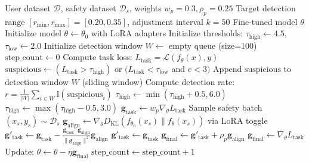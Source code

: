 \begin{algorithm}[H]
\caption{SelGrad Training with Adaptive Thresholds}
\label{alg:selgrad}
\footnotesize
\begin{algorithmic}[1]
\REQUIRE User dataset $\mathcal{D}$, safety dataset $\mathcal{D}_s$, weights $w_p=0.3, \rho_p=0.25$
\REQUIRE Target detection range $[r_{\min}, r_{\max}]=[0.20, 0.35]$, adjustment interval $k=50$
\ENSURE Fine-tuned model $\theta$
\STATE Initialize model $\theta \leftarrow \theta_0$ with LoRA adapters
\STATE Initialize thresholds: $\tau_{\text{high}} \leftarrow 4.5$, $\tau_{\text{low}} \leftarrow 2.0$
\STATE Initialize detection window $W \leftarrow$ empty queue (size=100)
\STATE $\text{step\_count} \leftarrow 0$
        \STATE {}
        \STATE Compute task loss: $L_{\text{task}} = \mathcal{L}(f_\theta(x), y)$
        \STATE $\text{suspicious} \leftarrow (L_{\text{task}} > \tau_{\text{high}})$ or $(L_{\text{task}} < \tau_{\text{low}}$ and $e < 3)$
        \STATE Append $\text{suspicious}$ to detection window $W$ (sliding window)
        \STATE {}
            \STATE Compute detection rate: $r = \frac{1}{|W|}\sum_{i \in W} \mathbb{I}(\text{suspicious}_i)$
                \STATE $\tau_{\text{high}} \leftarrow \min(\tau_{\text{high}} + 0.5, 6.0)$
                \STATE $\tau_{\text{high}} \leftarrow \max(\tau_{\text{high}} - 0.5, 3.0)$
            \ENDIF
        \ENDIF
        \STATE {}
            \STATE $\mathbf{g}_{\text{task}} \leftarrow w_p \nabla_\theta L_{\text{task}}$
            \STATE Sample safety batch $(x_s, y_s) \sim \mathcal{D}_s$
            \STATE $\mathbf{g}_{\text{align}} \leftarrow \nabla_\theta D_{\text{KL}}(f_{\theta_0}(x_s) \| f_\theta(x_s))$ via LoRA toggle
                \STATE $\mathbf{g}'_{\text{task}} \leftarrow \mathbf{g}_{\text{task}} - \frac{\mathbf{g}_{\text{task}} \cdot \mathbf{g}_{\text{align}}}{\|\mathbf{g}_{\text{align}}\|^2} \mathbf{g}_{\text{align}}$
            \ELSE
                \STATE $\mathbf{g}'_{\text{task}} \leftarrow \mathbf{g}_{\text{task}}$
            \ENDIF
            \STATE $\mathbf{g}_{\text{final}} \leftarrow \mathbf{g}'_{\text{task}} + \rho_p \mathbf{g}_{\text{align}}$
        \ELSE
            \STATE $\mathbf{g}_{\text{final}} \leftarrow \nabla_\theta L_{\text{task}}$
        \ENDIF
        \STATE Update: $\theta \leftarrow \theta - \eta \mathbf{g}_{\text{final}}$
        \STATE $\text{step\_count} \leftarrow \text{step\_count} + 1$
    \ENDFOR
\ENDFOR
\end{algorithmic}
\end{algorithm}

